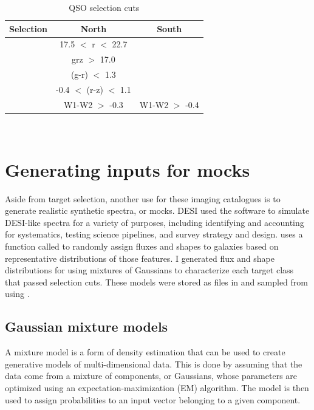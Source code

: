 \begin{table}
\caption{QSO selection cuts}
\label{tab:qso_cuts}
\centering
\begin{tabular}{|c|c|c|}
  \hline
  Selection & North & South\\
  \hline \hline
   & 17.5 $<$ r $<$ 22.7  \\
  \hline
   & grz $>$ 17.0  \\
  \hline
   & (g-r) $<$ 1.3 \\
  \hline
   & -0.4 $<$ (r-z) $<$ 1.1 \\
  \hline
   & W1-W2 $>$ -0.3 & W1-W2 $>$ -0.4\\
  \hline
\end{tabular}
\end{table}\\

\section{Generating inputs for mocks}
Aside from target selection, another use for these imaging catalogues is to generate realistic synthetic spectra, or mocks. DESI used the  software to simulate DESI-like spectra for a variety of purposes, including identifying and accounting for systematics, testing science pipelines, and survey strategy and design.  uses a function called  to randomly assign fluxes and shapes to galaxies based on representative distributions of those features. I generated flux and shape distributions for  using mixtures of Gaussians to characterize each target class that passed selection cuts. These models were stored as  files in  and sampled from using .


\subsection{Gaussian mixture models}


A mixture model is a form of density estimation that can be used to create generative models of multi-dimensional data. This is done by assuming that the data come from a mixture of components, or Gaussians, whose parameters are optimized using an expectation-maximization (EM) algorithm. The model is then used to assign probabilities to an input vector belonging to a given component. 

